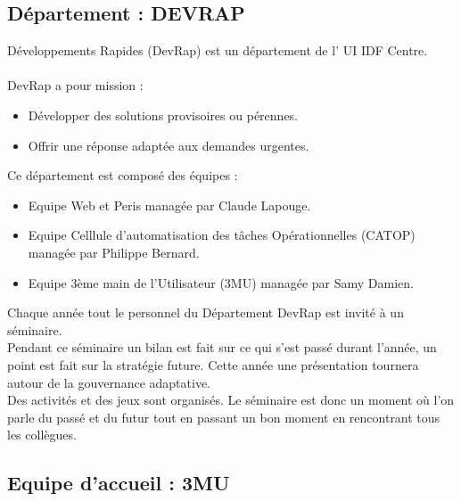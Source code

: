 \documentclass[a4paper,twoside,12pt,openright]{report}
\begin{document}
\subsection{Département : DEVRAP}
Développements Rapides (DevRap) est un département de l' UI IDF Centre.\\\\
DevRap a pour mission :
\begin{itemize}
\item Développer des solutions provisoires ou pérennes.
\item Offrir une réponse adaptée aux demandes urgentes.
\end{itemize}
Ce département est composé des équipes :
\begin{itemize}
\item Equipe Web et Peris managée par Claude Lapouge.
\item Equipe Celllule d'automatisation des tâches Opérationnelles (CATOP) managée par Philippe Bernard.
\item Equipe 3ème main de l'Utilisateur (3MU) managée par Samy Damien.
\end{itemize}
Chaque année tout le personnel du Département DevRap est invité à un séminaire.\\
Pendant ce séminaire un bilan est fait sur ce qui s'est passé durant l'année, un point est fait sur la stratégie future. Cette année une présentation tournera autour de la gouvernance adaptative.\\
Des activités et des jeux sont organisés. Le séminaire est donc un moment où l'on parle du passé et du futur tout en passant un bon moment en rencontrant tous les collègues. 
\subsection{Equipe d'accueil : 3MU}
\end{document}

